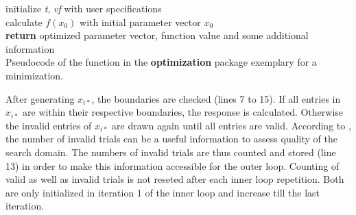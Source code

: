 \SetAlCapSkip{2ex}
\begin{algorithm}[H]
	initialize \textit{t}, \textit{vf} with user specifications\\
	calculate $f(x_0)$ with initial parameter vector $x_0$\\
	\textbf{return} optimized parameter vector, function value and some additional information \\
	\caption{Pseudocode of the  function in the \textbf{optimization} package exemplary for a minimization.}
	\label{alg:alg1}
\end{algorithm}

After generating $x_{i*}$, the boundaries are checked (lines 7 to 15). If all entries in $x_{i*}$ are within their respective boundaries, the response is calculated. Otherwise the invalid entries of $x_{i*}$ are drawn again until all entries are valid. According to \citet{corana_1987}, the number of invalid trials can be a useful information to assess quality of the search domain. The numbers of invalid trials are thus counted and stored (line 13) in order to make this information accessible for the outer loop. Counting of valid as well as invalid trials is not reseted after each inner loop repetition. Both are only initialized in iteration 1 of the inner loop and increase till the last iteration.

